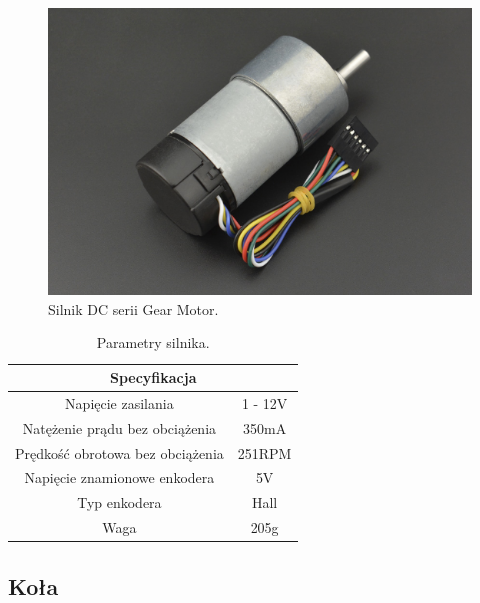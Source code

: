 \begin{figure}[ht]
	\centering
	\includegraphics[scale=0.7]{silnik.png}
	\caption{Silnik DC serii Gear Motor.}
	\label{fig:silnik}
\end{figure}



\begin{table}[]
	\centering
	\caption{Parametry silnika.}
	\label{parametry_silnika}
	\begin{tabular}{|c|c|}
		\hline
		\multicolumn{2}{|c|}{\textbf{Specyfikacja}} \\ \hline
		Napięcie zasilania                & 1 - 12V \\ \hline
		Natężenie prądu bez obciążenia    & 350mA   \\ \hline
		Prędkość obrotowa bez obciążenia  & 251RPM  \\ \hline
		Napięcie znamionowe enkodera      & 5V      \\ \hline
		Typ enkodera                      & Hall    \\ \hline
		Waga                              & 205g    \\ \hline
	\end{tabular}
\end{table}

\subsection{Koła}

